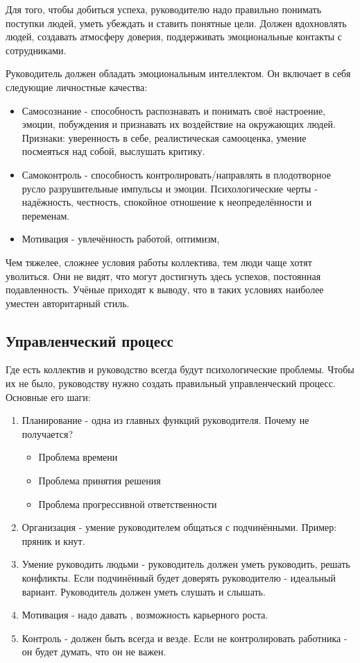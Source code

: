 Для того, чтобы добиться успеха, руководителю надо правильно понимать поступки людей, уметь убеждать и ставить понятные цели. Должен вдохновлять людей, создавать атмосферу доверия, поддерживать эмоциональные контакты с сотрудниками.

Руководитель должен обладать эмоциональным интеллектом. Он включает в себя следующие личностные качества:
\begin{itemize}
    \item Самосознание - способность распознавать и понимать своё настроение, эмоции, побуждения и признавать их воздействие на окружающих людей. Признаки: уверенность в себе, реалистическая самооценка, умение посмеяться над собой, выслушать критику.
    \item Самоконтроль - способность контролировать/направлять в плодотворное русло разрушительные импульсы и эмоции. Психологические черты - надёжность, честность, спокойное отношение к неопределённости и переменам.
    \item Мотивация - увлечённость работой, оптимизм, \missed{}
\end{itemize}

Чем тяжелее, сложнее условия работы коллектива, тем люди чаще хотят уволиться. Они не видят, что могут достигнуть здесь успехов, постоянная подавленность. Учёные приходят к выводу, что в таких условиях наиболее уместен авторитарный стиль.

\subsection{Управленческий процесс}

Где есть коллектив и руководство всегда будут психологические проблемы. Чтобы их не было, руководству нужно создать правильный управленческий процесс. Основные его шаги:
\begin{enumerate}
    \item Планирование - одна из главных функций руководителя. Почему не получается?
        \begin{itemize}
            \item Проблема времени
            \item Проблема принятия решения
            \item Проблема прогрессивной ответственности
        \end{itemize}
    \item Организация - умение руководителем общаться с подчинёнными. Пример: пряник и кнут.
    \item Умение руководить людьми - руководитель должен уметь руководить, решать конфликты. Если подчинённый будет доверять руководителю - идеальный вариант. Руководитель должен уметь слушать и слышать.
    \item Мотивация - надо давать \missed{}, возможность карьерного роста.
    \item Контроль - должен быть всегда и везде. Если не контролировать работника - он будет думать, что он не важен.
\end{enumerate}

